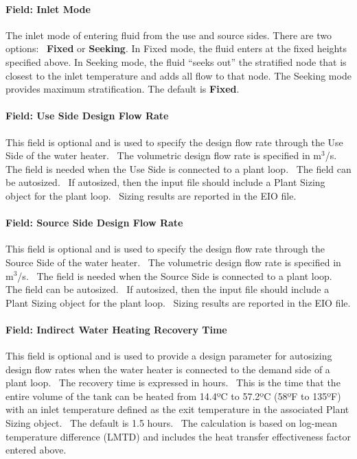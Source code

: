 \paragraph{Field: Inlet Mode}\label{field-inlet-mode-000}

The inlet mode of entering fluid from the use and source sides. There are two options:~ \textbf{Fixed} or \textbf{Seeking}. In Fixed mode, the fluid enters at the fixed heights specified above. In Seeking mode, the fluid ``seeks out'' the stratified node that is closest to the inlet temperature and adds all flow to that node. The Seeking mode provides maximum stratification. The default is \textbf{Fixed}.

\paragraph{Field: Use Side Design Flow Rate}\label{field-use-side-design-flow-rate-1-000}

This field is optional and is used to specify the design flow rate through the Use Side of the water heater.~ The volumetric design flow rate is specified in m\(^{3}\)/s.~ The field is needed when the Use Side is connected to a plant loop.~ The field can be autosized.~ If autosized, then the input file should include a Plant Sizing object for the plant loop.~ Sizing results are reported in the EIO file.

\paragraph{Field: Source Side Design Flow Rate}\label{field-source-side-design-flow-rate-1-000}

This field is optional and is used to specify the design flow rate through the Source Side of the water heater.~ The volumetric design flow rate is specified in m\(^{3}\)/s.~ The field is needed when the Source Side is connected to a plant loop.~ The field can be autosized.~ If autosized, then the input file should include a Plant Sizing object for the plant loop.~ Sizing results are reported in the EIO file.

\paragraph{Field: Indirect Water Heating Recovery Time}\label{field-indirect-water-heating-recovery-time-1}

This field is optional and is used to provide a design parameter for autosizing design flow rates when the water heater is connected to the demand side of a plant loop.~ The recovery time is expressed in hours.~ This is the time that the entire volume of the tank can be heated from 14.4ºC to 57.2ºC (58ºF to 135ºF) with an inlet temperature defined as the exit temperature in the associated Plant Sizing object.~ The default is 1.5 hours.~ The calculation is based on log-mean temperature difference (LMTD) and includes the heat transfer effectiveness factor entered above.

